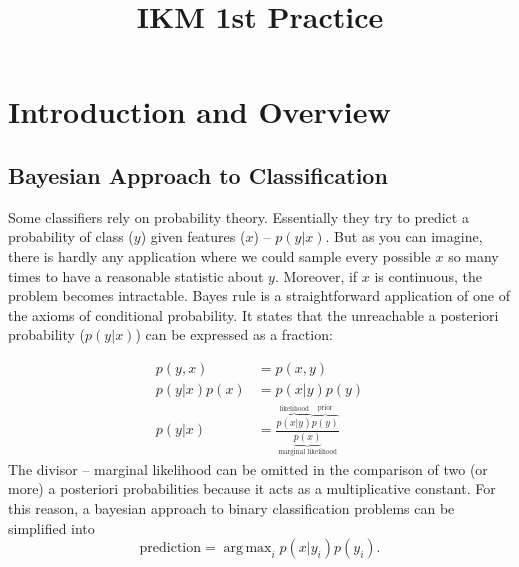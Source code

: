 \documentclass{article}
\title{IKM 1st Practice}
\author{}
\date{}
\DeclareMathOperator*{\argmax}{arg\,max}
\begin{document}
\maketitle

\section{Introduction and Overview}

\subsection{Bayesian Approach to Classification}
Some classifiers rely on probability theory. 
Essentially they try to predict a probability of class ($y$) given features ($x$) -- $p(y|x)$. 
But as you can imagine, there is hardly any application where we could sample every possible $x$ so many times to have a reasonable statistic about $y$. 
Moreover, if $x$ is continuous, the problem becomes intractable.
Bayes rule is a straightforward application of one of the axioms of conditional probability. 
It states that the unreachable a posteriori probability ($p(y|x)$) can be expressed as a fraction:

\begin{align}
    p(y, x) &= p(x, y) \\
    p(y | x) p(x) &= p(x|y) p(y) \\
    p(y | x) &= \frac{
        \overbrace{p(x | y)}^{\text{likelihood}} 
        \overbrace{p(y)}^{\text{prior}}}{
        \underbrace{p(x)}_{\text{marginal likelihood}}
    }
\end{align}
The divisor -- marginal likelihood can be omitted in the comparison of two (or more) a posteriori probabilities because it acts as a multiplicative constant.
For this reason, a bayesian approach to binary classification problems can be simplified into
\begin{equation}
    \label{eq:cls}
    \text{prediction} = \argmax_i p(x|y_i) p(y_i).
\end{equation}
\end{document}
